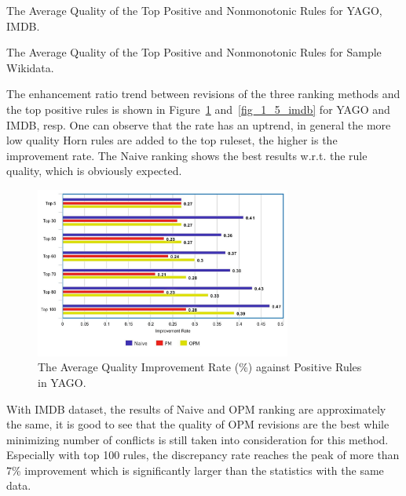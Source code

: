 \begin{table}[ht]
\centering
\footnotesize
\renewcommand*{\arraystretch}{1.07}
\centering

\smallskip
\caption{The Average Quality of the Top Positive and Nonmonotonic Rules for YAGO, IMDB.}
\label{tab:rules_quality1}
\end{table}

\begin{table}[ht]
\centering
\footnotesize
\renewcommand*{\arraystretch}{1.07}
\centering

\smallskip
\caption{The Average Quality of the Top Positive and Nonmonotonic Rules for Sample Wikidata.}
\label{tab:rules_quality2}
\end{table}

The enhancement ratio trend between revisions of the three ranking methods and the top positive rules is shown in Figure~\ref{fig_1_5_yago} and~\ref{fig_1_5_imdb} for YAGO and IMDB, resp. One can observe that the rate has an uptrend, in general the more low quality Horn rules are added to the top ruleset, the higher is the improvement rate. The Naive ranking shows the best results w.r.t. the rule quality, which is obviously expected.

\begin{figure}[ht]
\centering
\includegraphics[width=0.75\textwidth]{figures/table_1_5_yago.jpeg}
\caption{The Average Quality Improvement Rate (\%) against Positive Rules in YAGO.}
\label{fig_1_5_yago}
\end{figure}

With IMDB dataset, the results of Naive and OPM ranking are approximately the same, it is good to see that the quality of OPM revisions are the best while minimizing number of conflicts is still taken into consideration for this method. Especially with top 100 rules, the discrepancy rate reaches the peak of more than 7\% improvement which is significantly larger than the statistics with the same data.

